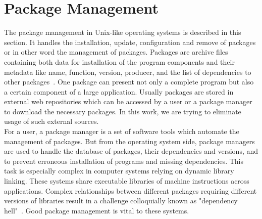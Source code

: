 \section{Package Management} \label{sec:pm}
The package management in Unix-like operating systems is described in this section.
It handles the installation, update, configuration and remove of packages or in other word the management of packages.
Packages are archive files containing both data for installation of the program components and their metadata like name, function, version, producer, and the list of dependencies to other packages~\cite*{opium}. 
One package can present not only a complete program but also a certain component of a large application.
Usually packages are stored in external web repositories which can be accessed by a user or a package manager to download the necessary packages. %
In this work, we are trying to eliminate usage of such external sources.\\
For a user, a package manager is a set of software tools which automate the management of packages.
But from the operating system side, package managers are used to handle the database of packages, their dependencies and versions, and to prevent erroneous installation of programs and missing dependencies.
This task is especially complex in computer systems relying on dynamic library linking. 
These systems share executable libraries of machine instructions across  applications. 
Complex relationships between different packages requiring different versions of libraries result in a challenge colloquially known as "dependency hell"~\cite*{linuxgeek}.
Good package management is vital to these systems.\\
